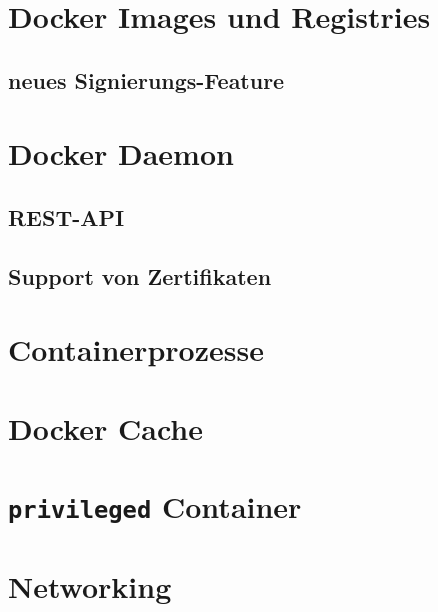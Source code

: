 \documentclass[../main.tex]{subfiles}
\begin{document}
  \section{Docker Images und Registries}



		\subsection{neues Signierungs-Feature}
	\section{Docker Daemon}
		\subsection{\acrshort{REST}-\acrshort{API}}
		\subsection{Support von Zertifikaten}
  \section{Containerprozesse}
	\section{Docker Cache}
	\section{\texttt{privileged} Container}


	\section{Networking}
\end{document}
